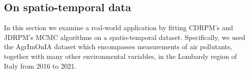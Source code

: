 \documentclass[12pt,	%
	a4paper,		%
	twoside,		%
	openright,		%
	titlepage,%
	]{book}
\theoremstyle{definition}
\let\cite\citep
\begin{document}
\subsection{On spatio-temporal data}
\label{On spatio-temporal data}

In this section we examine a real-world application by fitting CDRPM's and JDRPM's MCMC algorithms on a spatio-temporal dataset. Specifically, we used the AgrImOnIA dataset \cite{agrimonia} which encompasses measurements of air pollutants, together with many other environmental variables, in the Lombardy region of Italy from 2016 to 2021. 

\end{document}
